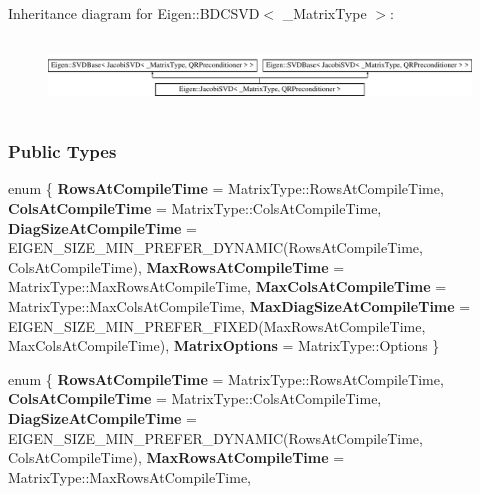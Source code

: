 Inheritance diagram for Eigen\+:\+:B\+D\+C\+S\+VD$<$ \+\_\+\+Matrix\+Type $>$\+:\begin{figure}[H]
\begin{center}
\leavevmode
\includegraphics[height=1.985816cm]{group___s_v_d___module}
\end{center}
\end{figure}
\subsubsection*{Public Types}
\begin{DoxyCompactItemize}
\item 
\mbox{\label{group___s_v_d___module_a6c791d5481ea7aed01ea45814995a37c}} 
enum \{ \newline
{\bfseries Rows\+At\+Compile\+Time} = Matrix\+Type\+:\+:Rows\+At\+Compile\+Time, 
{\bfseries Cols\+At\+Compile\+Time} = Matrix\+Type\+:\+:Cols\+At\+Compile\+Time, 
{\bfseries Diag\+Size\+At\+Compile\+Time} = E\+I\+G\+E\+N\+\_\+\+S\+I\+Z\+E\+\_\+\+M\+I\+N\+\_\+\+P\+R\+E\+F\+E\+R\+\_\+\+D\+Y\+N\+A\+M\+IC(Rows\+At\+Compile\+Time, Cols\+At\+Compile\+Time), 
{\bfseries Max\+Rows\+At\+Compile\+Time} = Matrix\+Type\+:\+:Max\+Rows\+At\+Compile\+Time, 
\newline
{\bfseries Max\+Cols\+At\+Compile\+Time} = Matrix\+Type\+:\+:Max\+Cols\+At\+Compile\+Time, 
{\bfseries Max\+Diag\+Size\+At\+Compile\+Time} = E\+I\+G\+E\+N\+\_\+\+S\+I\+Z\+E\+\_\+\+M\+I\+N\+\_\+\+P\+R\+E\+F\+E\+R\+\_\+\+F\+I\+X\+ED(Max\+Rows\+At\+Compile\+Time, Max\+Cols\+At\+Compile\+Time), 
{\bfseries Matrix\+Options} = Matrix\+Type\+:\+:Options
 \}
\item 
\mbox{\label{group___s_v_d___module_ac7c35303ba6f02ba61c7729793aa4d8e}} 
enum \{ \newline
{\bfseries Rows\+At\+Compile\+Time} = Matrix\+Type\+:\+:Rows\+At\+Compile\+Time, 
{\bfseries Cols\+At\+Compile\+Time} = Matrix\+Type\+:\+:Cols\+At\+Compile\+Time, 
{\bfseries Diag\+Size\+At\+Compile\+Time} = E\+I\+G\+E\+N\+\_\+\+S\+I\+Z\+E\+\_\+\+M\+I\+N\+\_\+\+P\+R\+E\+F\+E\+R\+\_\+\+D\+Y\+N\+A\+M\+IC(Rows\+At\+Compile\+Time, Cols\+At\+Compile\+Time), 
{\bfseries Max\+Rows\+At\+Compile\+Time} = Matrix\+Type\+:\+:Max\+Rows\+At\+Compile\+Time, 

\end{DoxyCompactItemize}
